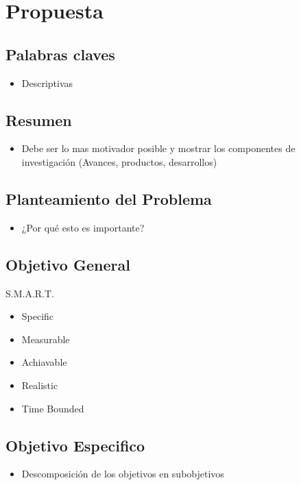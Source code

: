 \section{Propuesta}

\subsection{Palabras claves}
	\begin{itemize}
		\item Descriptivas
	\end{itemize}


\subsection{Resumen}
	\begin{itemize}
		\item Debe ser lo mas motivador posible y mostrar los componentes de investigación (Avances, productos, desarrollos)
	\end{itemize}


\subsection{Planteamiento del Problema}
	\begin{itemize}
		\item ¿Por qué esto es importante?
	\end{itemize}


\subsection{Objetivo General}
	S.M.A.R.T.
	\begin{itemize}
		\item Specific
		\item Measurable
		\item Achiavable
		\item Realistic
		\item Time Bounded
	\end{itemize}


\subsection{Objetivo Especifico}
	\begin{itemize}
		\item Descomposición de los objetivos en subobjetivos
	\end{itemize}


